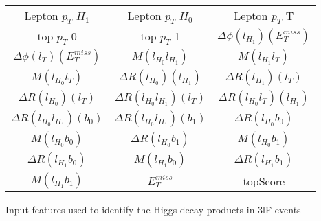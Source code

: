   \begin{center}
  \begin{tabular}{ccc}
    \hline\hline
    Lepton  $p_T$ $H_1$ & Lepton  $p_T$ $H_0$ & Lepton  $p_T$ T \\
    top  $p_T$ 0 & top  $p_T$ 1 & $\Delta\phi(l_{H_1})(E_T^{miss})$ \\
    $\Delta\phi(l_{T})(E_T^{miss})$ & $M(l_{H_0}l_{H_1})$ & $M(l_{H_1}l_{T})$ \\
    $M(l_{H_0}l_{T})$ & $\Delta R(l_{H_0})(l_{H_1})$ & $\Delta R(l_{H_1})(l_{T})$ \\
    $\Delta R(l_{H_0})(l_{T})$ & $\Delta R(l_{H_0}l_{H_1})(l_{T})$ & $\Delta R(l_{H_0}l_{T})(l_{H_1})$ \\
    $\Delta R(l_{H_0}l_{H_1})(b_0)$ & $\Delta R(l_{H_0}l_{H_1})(b_1)$ & $\Delta R(l_{H_0}b_0)$ \\
    $M(l_{H_0}b_0)$ & $\Delta R(l_{H_0}b_1)$ & $M(l_{H_0}b_1)$ \\
    $\Delta R(l_{H_1}b_0)$ & $M(l_{H_1}b_0)$ & $\Delta R(l_{H_1}b_1)$ \\
    $M(l_{H_1}b_1)$ & $E_T^{miss}$ & topScore \\
    \hline
  \end{tabular}
  \end{center}
  \caption{Input features used to identify the Higgs decay products in 3lF events}
  \label{tab:higgsTop3lFfeatures}

